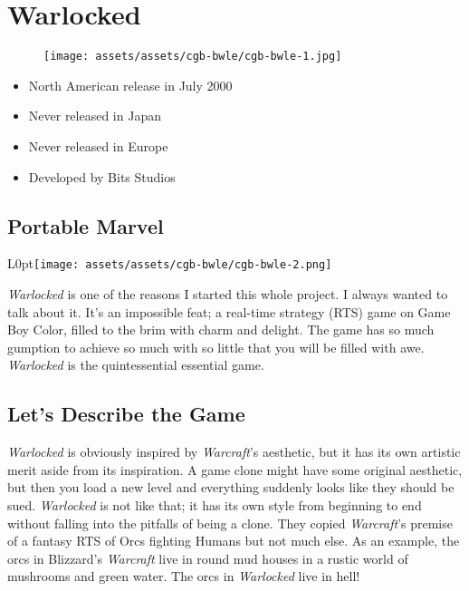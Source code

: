 \documentclass{book}
\begin{document}
\chapter*{Warlocked}
\vspace{\baselineskip}\begin{figure}[H]{\texttt{[image: assets/assets/cgb-bwle/cgb-bwle-1.jpg]}}\end{figure}\vspace{\baselineskip}
\begin{itemize}[left=0pt, nosep]
\item North American release in July 2000
\item Never released in Japan
\item Never released in Europe
\item Developed by Bits Studios

\end{itemize}
\newpage\FloatBarrier\section*{Portable Marvel}
\begin{wrapfigure}{L}{0pt}{\texttt{[image: assets/assets/cgb-bwle/cgb-bwle-2.png]}}\end{wrapfigure}\noindent
\emph{Warlocked} is one of the reasons I started this whole project. I always wanted to talk about it. It’s an impossible feat; a real-time strategy (RTS) game on Game Boy Color, filled to the brim with charm and delight. The game has so much gumption to achieve so much with so little that you will be filled with awe. \emph{Warlocked} is the quintessential essential game.\par
\FloatBarrier\section*{Let’s Describe the Game}
\emph{Warlocked} is obviously inspired by \emph{Warcraft}’s aesthetic, but it has its own artistic merit aside from its inspiration. A game clone might have some original aesthetic, but then you load a new level and everything suddenly looks like they should be sued. \emph{Warlocked} is not like that; it has its own style from beginning to end without falling into the pitfalls of being a clone. They copied \emph{Warcraft}’s premise of a fantasy RTS of Orcs fighting Humans but not much else. As an example, the orcs in Blizzard’s \emph{Warcraft} live in round mud houses in a rustic world of mushrooms and green water. The orcs in \emph{Warlocked} live in hell!\par
\end{document}

